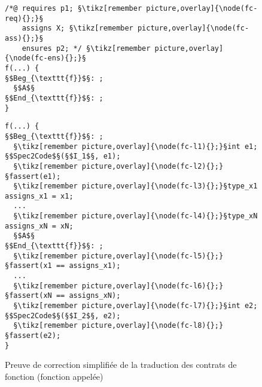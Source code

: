 \begin{figure}[bt]
  \begin{minipage}{0.65\textwidth}
    \begin{lstlisting}[escapechar=§]
/*@ requires p1; §\tikz[remember picture,overlay]{\node(fc-req){};}§
    assigns X; §\tikz[remember picture,overlay]{\node(fc-ass){};}§
    ensures p2; */ §\tikz[remember picture,overlay]{\node(fc-ens){};}§
f(...) {
§$Beg_{\texttt{f}}$§: ;
  §$A$§
§$End_{\texttt{f}}$§: ;
}
    \end{lstlisting}
  \end{minipage}\hfill
  \begin{minipage}{0.49\textwidth}
    \begin{lstlisting}[escapechar=§]
f(...) {
§$Beg_{\texttt{f}}$§: ;
  §\tikz[remember picture,overlay]{\node(fc-l1){};}§int e1; §$Spec2Code$§(§$I_1$§, e1);
  §\tikz[remember picture,overlay]{\node(fc-l2){};}§fassert(e1);
  §\tikz[remember picture,overlay]{\node(fc-l3){};}§type_x1 assigns_x1 = x1;
  ...
  §\tikz[remember picture,overlay]{\node(fc-l4){};}§type_xN assigns_xN = xN;
  §$A$§
§$End_{\texttt{f}}$§: ;
  §\tikz[remember picture,overlay]{\node(fc-l5){};}§fassert(x1 == assigns_x1);
  ...
  §\tikz[remember picture,overlay]{\node(fc-l6){};}§fassert(xN == assigns_xN);
  §\tikz[remember picture,overlay]{\node(fc-l7){};}§int e2; §$Spec2Code$§(§$I_2$§, e2);
  §\tikz[remember picture,overlay]{\node(fc-l8){};}§fassert(e2);
}
    \end{lstlisting}
  \end{minipage}
  \caption{Preuve de correction simplifiée de la traduction des contrats de
    fonction (fonction appelée)}
  \label{fig:proof-fct-contract-call}
\end{figure}
